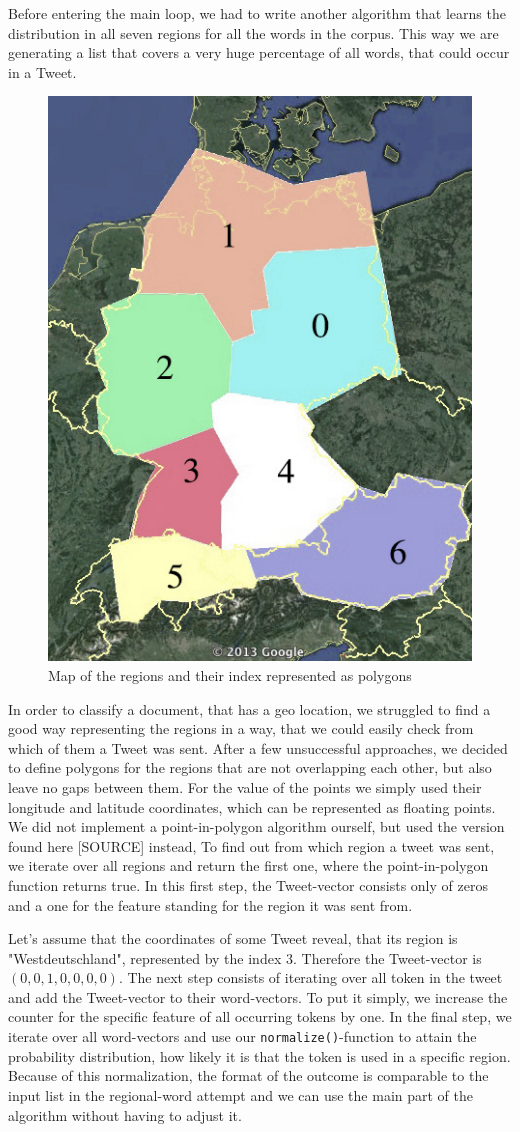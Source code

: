 \documentclass[../Main.tex]{subfiles}
\begin{document}
Before entering the main loop, we had to write another algorithm that learns the distribution in all seven regions for all the words in the corpus. This way we are generating a list that covers a very huge percentage of all words, that could occur in a Tweet.
\begin{figure}
  \begin{center}
   \includegraphics[width=0.5\columnwidth]{../img/polygone_satt.jpg}
    \caption{\label{geo_polymap} Map of the regions and their index represented as polygons}
  \end{center}
\end{figure}
In order to classify a document, that has a geo location, we struggled to find a good way representing the regions in a way, that we could easily check from which of them a Tweet was sent. After a few unsuccessful approaches, we decided to define polygons for the regions that are not overlapping each other, but also leave no gaps between them. For the value of the points we simply used their longitude and latitude coordinates, which can be represented as floating points.  
We did not implement a point-in-polygon algorithm ourself, but used the version found here [SOURCE] instead,  
To find out from which region a tweet was sent, we iterate over all regions and return the first one, where the point-in-polygon function returns true.
In this first step, the Tweet-vector consists only of zeros and a one for the feature standing for the region it was sent from. 

Let's assume that the coordinates of some Tweet reveal, that its region is "Westdeutschland", represented by the index $3$.
Therefore the Tweet-vector is $(0,0,1,0,0,0,0)$. 
The next step consists of iterating over all token in the tweet and add the Tweet-vector to their word-vectors. To put it simply, we increase the counter for the specific feature of all occurring tokens by one. 
In the final step, we iterate over all word-vectors and use our \texttt{normalize()}-function to attain the probability distribution, how likely it is that the token is used in a specific region. Because of this normalization, the format of the outcome is comparable to the input list in the regional-word attempt and we can use the main part of the algorithm without having to adjust it.
\end{document}
